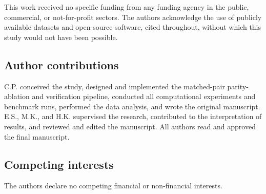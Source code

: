 This work received no specific funding from any funding agency in the public, commercial, or not-for-profit sectors. The authors acknowledge the use of publicly available datasets and open-source software, cited throughout, without which this study would not have been possible.

\subsection*{Author contributions}

C.P. conceived the study, designed and implemented the matched-pair parity-ablation and verification pipeline, conducted all computational experiments and benchmark runs, performed the data analysis, and wrote the original manuscript. E.S., M.K., and H.K. supervised the research, contributed to the interpretation of results, and reviewed and edited the manuscript. All authors read and approved the final manuscript.

\subsection*{Competing interests}

The authors declare no competing financial or non-financial interests.


